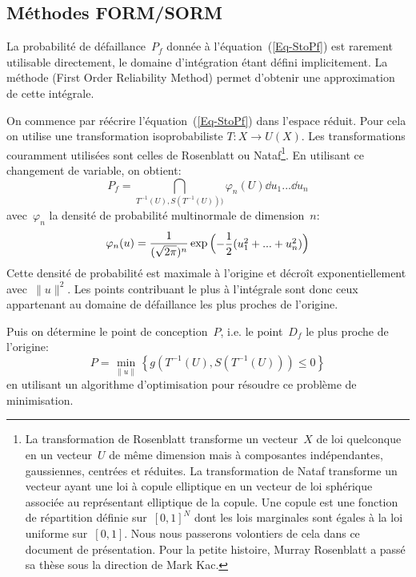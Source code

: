 \medskip
\subsection{Méthodes FORM/SORM}
La probabilité de défaillance~$P_f$ donnée à l'équation~(\ref{Eq-StoPf}) est rarement utilisable directement, le domaine d'intégration étant défini implicitement. La méthode  (First Order Reliability Method) permet d'obtenir une approximation de cette intégrale.

On commence par réécrire l'équation~(\ref{Eq-StoPf}) dans l'espace réduit. Pour cela on utilise une transformation isoprobabiliste $T : X \rightarrow U(X)$. Les transformations couramment utilisées sont celles de Rosenblatt ou Nataf\footnote{La transformation de Rosenblatt transforme un vecteur~$X$ de loi quelconque en un vecteur~$U$ de même dimension mais à composantes indépendantes, gaussiennes, centrées et réduites. La transformation de Nataf transforme un vecteur ayant une loi à copule elliptique en un vecteur de loi sphérique associée au représentant elliptique de la copule. Une copule est une fonction de répartition définie sur~$[0,1]^N$ dont les lois marginales sont égales à la loi uniforme sur~$[0,1]$. Nous nous passerons volontiers de cela dans ce document de présentation. Pour la petite histoire, Murray Rosenblatt a passé sa thèse sous la direction de Mark Kac.}. En utilisant ce changement de variable, on obtient:
\begin{equation}\label{Eq-StoPfU}
P_f=\dint_{T^{-1}(U),S(T^{-1}(U)))} \varphi_n(U) \dd u_1...\dd u_n
\end{equation}
avec~$\varphi_n$ la densité de probabilité multinormale de dimension~$n$:
\begin{equation}
\varphi_n(u)=\dfrac1{(\sqrt{2\pi})^n}\exp\begin{pmatrix}-\dfrac12(u_1^2+...+u_n^2)\end{pmatrix}
\end{equation}
Cette densité de probabilité est maximale à l'origine et décroît exponentiellement avec~$\|u\|^2$. Les points contribuant le plus à l'intégrale sont donc ceux appartenant au domaine de défaillance les plus proches de l'origine.

Puis on détermine le point de conception~$P$, i.e. le point~$D_f$ le plus proche de l'origine:
\begin{equation}
P = \min_{\|u\|} \left\{g(T^{-1}(U),S(T^{-1}(U)))\le0\right\}
\end{equation}
en utilisant un algorithme d'optimisation pour résoudre ce problème de minimisation.

